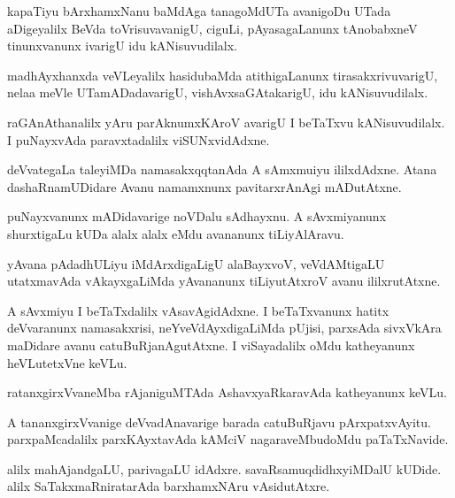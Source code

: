 \documentclass{article}
\begin{document}
\begin{mn}%
kapaTiyu bArxhamxNanu baMdAga tanagoMdUTa avanigoDu UTada aDigeyalilx BeVda toVrisuvavanigU,
ciguLi, pAyasagaLanunx tAnobabxneV tinunxvanunx ivarigU idu kANisuvudilalx.
\end{mn}

\begin{mn}%
madhAyxhanxda veVLeyalilx hasidubaMda atithigaLanunx tirasakxrivuvarigU, nelaa meVle 
UTamADadavarigU, vishAvxsaGAtakarigU, idu kANisuvudilalx.
\end{mn}

\begin{mn}%
raGAnAthanalilx yAru parAknumxKAroV avarigU I beTaTxvu kANisuvudilalx. I puNayxvAda 
paravxtadalilx viSUNxvidAdxne.
\end{mn}

\begin{mn}%
deVvategaLa taleyiMDa namasakxqqtanAda A sAmxmuiyu ililxdAdxne. Atana dashaRnamUDidare Avanu 
namamxnunx pavitarxrAnAgi mADutAtxne.
\end{mn}

\begin{mn}%
puNayxvanunx mADidavarige noVDalu sAdhayxnu. A sAvxmiyanunx shurxtigaLu kUDa alalx alalx 
eMdu avananunx tiLiyAlAravu.
\end{mn}

\begin{mn}%
yAvana pAdadhULiyu iMdArxdigaLigU alaBayxvoV, veVdAMtigaLU utatxmavAda vAkayxgaLiMda 
yAvananunx tiLiyutAtxroV avanu ililxrutAtxne.
\end{mn}

\begin{mn}%
A sAvxmiyu I beTaTxdalilx vAsavAgidAdxne. I beTaTxvanunx hatitx deVvaranunx namasakxrisi, 
neYveVdAyxdigaLiMda pUjisi, parxsAda sivxVkAra maDidare avanu catuBuRjanAgutAtxne. I 
viSayadalilx oMdu katheyanunx heVLutetxVne keVLu.
\end{mn}

\begin{mn}%
ratanxgirxVvaneMba rAjaniguMTAda AshavxyaRkaravAda katheyanunx keVLu.
\end{mn}

\begin{mn}%
A tananxgirxVvanige deVvadAnavarige barada catuBuRjavu pArxpatxvAyitu. parxpaMcadalilx 
parxKAyxtavAda kAMciV nagaraveMbudoMdu paTaTxNavide.
\end{mn}

\begin{mn}%
alilx mahAjandgaLU, parivagaLU idAdxre. savaRsamuqdidhxyiMDalU kUDide. alilx 
SaTakxmaRniratarAda barxhamxNAru vAsidutAtxre.
\end{mn}
\end{document}
